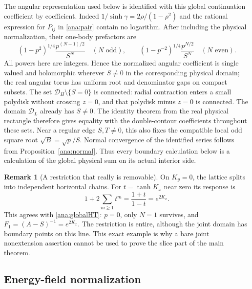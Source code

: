 \documentclass[11pt]{article}
\numberwithin{equation}{section}
\theoremstyle{definition}
\newtheorem{remark}[theorem]{Remark}
\renewcommand{\DH}{\mathcal D_H}
\newcommand{\DL}{\mathcal D_L}
\begin{document}
The angular representation used below is identified with this global
continuation coefficient by coefficient. Indeed
\(1/\sinh\gamma=2\rho/(1-\rho^2)\) and the rational expression
for \(P_{ij}\) in \eqref{ana:pair} contain no logarithm. After
including the physical normalization, their one-body prefactors are
\[
 (1-p^2)^{1/4}\frac{p^{(N-1)/2}}{S^N}
 \quad(N\text{ odd}),\qquad
 (1-p^{-2})^{1/4}\frac{p^{N/2}}{S^N}
 \quad(N\text{ even}).
\]
All powers here are integers. Hence the normalized angular coefficient
is single valued and holomorphic wherever \(S\ne0\) in the
corresponding physical domain; the real angular torus has uniform
root and denominator gaps on compact subsets. The set
\(\DH\setminus\{S=0\}\) is connected: radial contraction enters
a small polydisk without crossing \(z=0\), and that polydisk minus
\(z=0\) is connected. The domain \(\DL\) already has \(S\ne0\).
The identity theorem from the real physical rectangle therefore gives
equality with the double-contour coefficients throughout these sets.
Near a regular edge \(S,T\ne0\), this also fixes the compatible
local odd square root \(\sqrt B=\sqrt p/S\). Normal convergence
of the identified series follows from Proposition~\ref{ana:normal}.
Thus every boundary calculation below is a calculation of the global
physical sum on its actual interior side.

\begin{remark}[A restriction that really is removable]\label{ana:axis}
On \(K_y=0\), the lattice splits into independent horizontal chains.
For \(t=\tanh K_x\) near zero its response is
\[
 1+2\sum_{m\ge1}t^m=\frac{1+t}{1-t}=e^{2K_x}.
\]
This agrees with \eqref{ana:globalHT}: \(p=0\), only \(N=1\)
survives, and \(F_1=(A-S)^{-1}=e^{2K_x}\).
The restriction is entire, although the joint domain has boundary
points on this line. This exact example is why a bare joint
nonextension assertion cannot be used to prove the slice part
of the main theorem.
\end{remark}

\subsection{Energy-field normalization}
\end{document}
